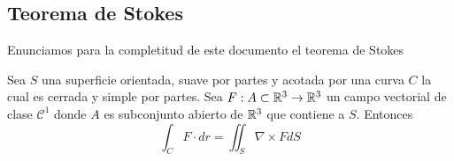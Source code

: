 \message{ !name(MAT024.tex)}\documentclass[../main.tex]{subfiles}
\begin{document}


\subsection{Teorema de Stokes}
Enunciamos para la completitud de este documento el teorema de Stokes
\begin{teorema}[Stokes]
  Sea $S$ una superficie orientada, suave por partes y acotada por una curva $C$ la cual es cerrada y simple por partes.
  Sea $F: A \subset \mathbb{R}^{3} \to \mathbb{R}^{3}$ un campo vectorial de clase $\mathcal{C}^{1}$ donde $A$ es subconjunto abierto de $\mathbb{R}^{3}$ que contiene a $S$. Entonces
  \begin{equation*}
    \int_{C} F \cdot dr = \iint_{S} \nabla \times F dS
  \end{equation*}
\end{teorema}
\end{document}

